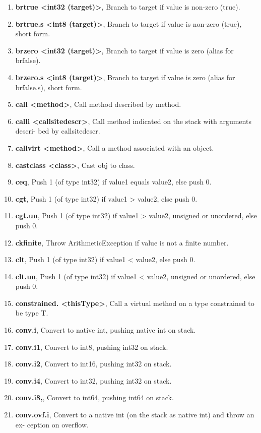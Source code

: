 \documentclass[12pt,a4paper,twoside]{report}
\begin{document}
\begin{enumerate}
\item \textbf{brtrue <int32 (target)>}, Branch to target if value is non-zero (true).
\item \textbf{brtrue.s <int8 (target)>}, Branch to target if value is non-zero (true), short form.
\item \textbf{brzero <int32 (target)>}, Branch to target if value is zero (alias for brfalse).
\item \textbf{brzero.s <int8 (target)>}, Branch to target if value is zero (alias for brfalse.s), short form.
\item \textbf{call <method>}, Call method described by method.
\item \textbf{calli <callsitedescr>}, Call method indicated on the stack with arguments descri-
bed by callsitedescr.

\item \textbf{callvirt <method>}, Call a method associated with an object.
\item \textbf{castclass <class>}, Cast obj to class.
\item \textbf{ceq}, Push 1 (of type int32) if value1 equals value2, else push 0.
\item \textbf{cgt}, Push 1 (of type int32) if value1 > value2, else push 0.
\item \textbf{cgt.un}, Push 1 (of type int32) if value1 > value2, unsigned or unordered, else
push 0.
\item \textbf{ckfinite}, Throw ArithmeticException if value is not a finite number.
\item \textbf{clt}, Push 1 (of type int32) if value1 < value2, else push 0.
\item \textbf{clt.un}, Push 1 (of type int32) if value1 < value2, unsigned or unordered, else push
0.
\item \textbf{constrained. <thisType>}, Call a virtual method on a type constrained to be type
T.
\item \textbf{conv.i}, Convert to native int, pushing native int on stack.
\item \textbf{conv.i1}, Convert to int8, pushing int32 on stack.
\item \textbf{conv.i2}, Convert to int16, pushing int32 on stack.
\item \textbf{conv.i4}, Convert to int32, pushing int32 on stack.
\item \textbf{conv.i8,}, Convert to int64, pushing int64 on stack.
\item \textbf{conv.ovf.i}, Convert to a native int (on the stack as native int) and throw an ex-
ception on overflow.

\end{enumerate}
\end{document}
